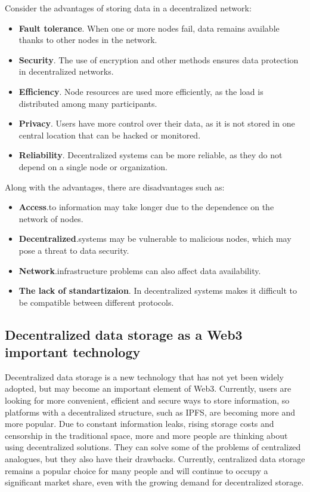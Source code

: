 \documentclass[10pt,conference,a4paper]{IEEEtran_EDM}
\begin{document}
Consider the advantages of storing data in a decentralized network:
\begin{itemize}
    \item \textbf{Fault tolerance}. When one or more nodes fail, data remains available thanks to other nodes in the network.
    \item \textbf{Security}. The use of encryption and other methods ensures data protection in decentralized networks.
    \item \textbf{Efficiency}. Node resources are used more efficiently, as the load is distributed among many participants.
    \item \textbf{Privacy}. Users have more control over their data, as it is not stored in one central location that can be hacked or monitored.
    \item \textbf{Reliability}. Decentralized systems can be more reliable, as they do not depend on a single node or organization.
\end{itemize}
Along with the advantages, there are disadvantages such as:
\begin{itemize}
    \item \textbf{Access}.to information may take longer due to the dependence on the network of nodes.
    \item \textbf{Decentralized}.systems may be vulnerable to malicious nodes, which may pose a threat to data security.
    \item \textbf{Network}.infrastructure problems can also affect data availability.
    \item \textbf{The lack of standartizaion}. In decentralized systems makes it difficult to be compatible between different protocols.
\end{itemize}

\subsection{Decentralized data storage as a Web3 important technology }

Decentralized data storage is a new technology that has not yet been widely adopted, but may become an important element of Web3. Currently, users are looking for more convenient, efficient and secure ways to store information, so platforms with a decentralized structure, such as IPFS, are becoming more and more popular. Due to constant information leaks, rising storage costs and censorship in the traditional space, more and more people are thinking about using decentralized solutions. They can solve some of the problems of centralized analogues, but they also have their drawbacks. Currently, centralized data storage remains a popular choice for many people and will continue to occupy a significant market share, even with the growing demand for decentralized storage.
\end{document}
